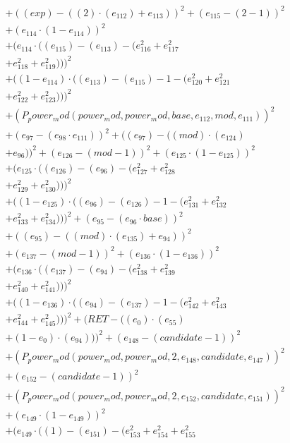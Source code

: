 \documentclass[10pt, a4paper]{article}
\begin{document}
\begin{align*}
& + ((exp) - ((2)  \cdot  (e_{112}) + e_{113}))^{2} + (e_{115} - (2 - 1))^{2} \\
& + (e_{114}  \cdot  (1 - e_{114}))^{2} \\
& + (e_{114}  \cdot  ((e_{115}) - (e_{113}) - (e_{116}^{2} + e_{117}^{2} \\
& + e_{118}^{2} + e_{119}^{2})))^{2} \\
& + ((1 - e_{114})  \cdot  ((e_{113}) - (e_{115}) - 1 - (e_{120}^{2} + e_{121}^{2} \\
& + e_{122}^{2} + e_{123}^{2})))^{2} \\
& + (P_power_mod(power_mod, power_mod, base, e_{112}, mod, e_{111}))^{2} \\
& + (e_{97} - (e_{98}  \cdot  e_{111}))^{2} + ((e_{97}) - ((mod)  \cdot  (e_{124}) \\
& + e_{96}))^{2} + (e_{126} - (mod - 1))^{2} + (e_{125}  \cdot  (1 - e_{125}))^{2} \\
& + (e_{125}  \cdot  ((e_{126}) - (e_{96}) - (e_{127}^{2} + e_{128}^{2} \\
& + e_{129}^{2} + e_{130}^{2})))^{2} \\
& + ((1 - e_{125})  \cdot  ((e_{96}) - (e_{126}) - 1 - (e_{131}^{2} + e_{132}^{2} \\
& + e_{133}^{2} + e_{134}^{2})))^{2} + (e_{95} - (e_{96}  \cdot  base))^{2} \\
& + ((e_{95}) - ((mod)  \cdot  (e_{135}) + e_{94}))^{2} \\
& + (e_{137} - (mod - 1))^{2} + (e_{136}  \cdot  (1 - e_{136}))^{2} \\
& + (e_{136}  \cdot  ((e_{137}) - (e_{94}) - (e_{138}^{2} + e_{139}^{2} \\
& + e_{140}^{2} + e_{141}^{2})))^{2} \\
& + ((1 - e_{136})  \cdot  ((e_{94}) - (e_{137}) - 1 - (e_{142}^{2} + e_{143}^{2} \\
& + e_{144}^{2} + e_{145}^{2})))^{2} + (RET - ((e_{0})  \cdot  (e_{55}) \\
& + (1 - e_{0})  \cdot  (e_{94})))^{2} + (e_{148} - (candidate - 1))^{2} \\
& + (P_power_mod(power_mod, power_mod, 2, e_{148}, candidate, e_{147}))^{2} \\
& + (e_{152} - (candidate - 1))^{2} \\
& + (P_power_mod(power_mod, power_mod, 2, e_{152}, candidate, e_{151}))^{2} \\
& + (e_{149}  \cdot  (1 - e_{149}))^{2} \\
& + (e_{149}  \cdot  ((1) - (e_{151}) - (e_{153}^{2} + e_{154}^{2} + e_{155}^{2} \\

\end{align*}
\end{document}
